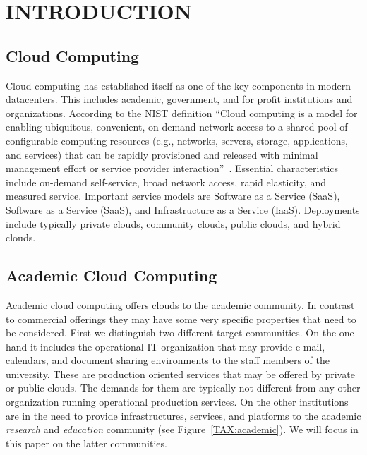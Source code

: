 \documentclass{sig-alternate-05-2015}
\begin{document}

\printccsdesc



\section{INTRODUCTION}

\subsection{Cloud Computing}

Cloud computing has established itself as one of the key components in modern datacenters. This includes academic, government, and for profit institutions and organizations.  According to the NIST definition ``Cloud computing is a model for enabling ubiquitous, convenient, on-demand network access to a shared pool of configurable computing resources (e.g., networks, servers, storage, applications, and services) that can be rapidly provisioned and released with minimal management effort or service provider interaction''~\cite{mell2011nist}. Essential characteristics include on-demand self-service, broad network access, rapid elasticity, and measured service. Important service models are Software as a Service (SaaS), Software as a Service (SaaS), and Infrastructure as a Service (IaaS). Deployments include typically private clouds, community clouds, public clouds, and hybrid clouds.

\subsection{Academic Cloud Computing}

Academic cloud computing offers clouds to the academic community. In contrast to commercial offerings they may have some very specific properties that need to be considered. First we distinguish two different target communities. On the one hand it includes the operational IT organization that may provide e-mail, calendars, and document sharing environments to the staff members of the university. These are production oriented services that may be offered by private or public clouds.  The demands for them are typically not different from any other organization running operational production services. On the other institutions are in the need to provide infrastructures, services, and platforms to the academic {\it
  research} and {\it education} community (see
Figure~\ref{TAX:academic}). We will focus in this paper on the latter
communities.
\end{document}

